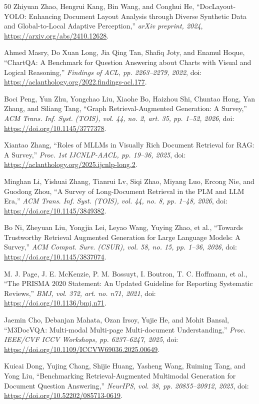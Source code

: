 \documentclass[conference,a4paper]{IEEEtran}
\begin{document}
\begin{thebibliography}{50}
 Zhiyuan Zhao, Hengrui Kang, Bin Wang, and Conghui He, ``DocLayout-YOLO: Enhancing Document Layout Analysis through Diverse Synthetic Data and Global-to-Local Adaptive Perception,'' \emph{arXiv preprint, 2024}, \url{https://arxiv.org/abs/2410.12628}.

 Ahmed Masry, Do Xuan Long, Jia Qing Tan, Shafiq Joty, and Enamul Hoque, ``ChartQA: A Benchmark for Question Answering about Charts with Visual and Logical Reasoning,'' \emph{Findings of ACL, pp. 2263--2279, 2022}, doi: \url{https://aclanthology.org/2022.findings-acl.177}.

 Boci Peng, Yun Zhu, Yongchao Liu, Xiaohe Bo, Haizhou Shi, Chuntao Hong, Yan Zhang, and Siliang Tang, ``Graph Retrieval-Augmented Generation: A Survey,'' \emph{ACM Trans. Inf. Syst. (TOIS), vol. 44, no. 2, art. 35, pp. 1--52, 2026}, doi: \url{https://doi.org/10.1145/3777378}.

 Xiantao Zhang, ``Roles of MLLMs in Visually Rich Document Retrieval for RAG: A Survey,'' \emph{Proc. 1st IJCNLP-AACL, pp. 19--36, 2025}, doi: \url{https://aclanthology.org/2025.ijcnlp-long.2}.

 Minghan Li, Yishuai Zhang, Tianrui Lv, Siqi Zhao, Miyang Luo, Ercong Nie, and Guodong Zhou, ``A Survey of Long-Document Retrieval in the PLM and LLM Era,'' \emph{ACM Trans. Inf. Syst. (TOIS), vol. 44, no. 8, pp. 1--48, 2026}, doi: \url{https://doi.org/10.1145/3849382}.

 Bo Ni, Zheyuan Liu, Yongjia Lei, Leyao Wang, Yuying Zhao, et al., ``Towards Trustworthy Retrieval Augmented Generation for Large Language Models: A Survey,'' \emph{ACM Comput. Surv. (CSUR), vol. 58, no. 15, pp. 1--36, 2026}, doi: \url{https://doi.org/10.1145/3837074}.

 M. J. Page, J. E. McKenzie, P. M. Bossuyt, I. Boutron, T. C. Hoffmann, et al., ``The PRISMA 2020 Statement: An Updated Guideline for Reporting Systematic Reviews,'' \emph{BMJ, vol. 372, art. no. n71, 2021}, doi: \url{https://doi.org/10.1136/bmj.n71}.

 Jaemin Cho, Debanjan Mahata, Ozan Irsoy, Yujie He, and Mohit Bansal, ``M3DocVQA: Multi-modal Multi-page Multi-document Understanding,'' \emph{Proc. IEEE/CVF ICCV Workshops, pp. 6237--6247, 2025}, doi: \url{https://doi.org/10.1109/ICCVW69036.2025.00649}.

 Kuicai Dong, Yujing Chang, Shijie Huang, Yasheng Wang, Ruiming Tang, and Yong Liu, ``Benchmarking Retrieval-Augmented Multimodal Generation for Document Question Answering,'' \emph{NeurIPS, vol. 38, pp. 20855--20912, 2025}, doi: \url{https://doi.org/10.52202/085713-0619}.


\end{thebibliography}
\end{document}
